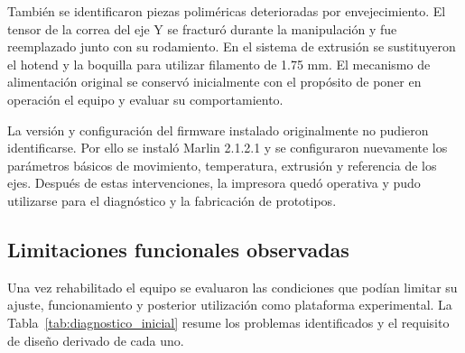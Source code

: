 También se identificaron piezas poliméricas deterioradas por envejecimiento. El tensor de la correa del eje Y se fracturó durante la manipulación y fue reemplazado junto con su rodamiento. En el sistema de extrusión se sustituyeron el hotend y la boquilla para utilizar filamento de 1.75 mm. El mecanismo de alimentación original se conservó inicialmente con el propósito de poner en operación el equipo y evaluar su comportamiento.

La versión y configuración del firmware instalado originalmente no pudieron identificarse. Por ello se instaló Marlin 2.1.2.1 y se configuraron nuevamente los parámetros básicos de movimiento, temperatura, extrusión y referencia de los ejes. Después de estas intervenciones, la impresora quedó operativa y pudo utilizarse para el diagnóstico y la fabricación de prototipos.

\subsection{Limitaciones funcionales observadas}

Una vez rehabilitado el equipo se evaluaron las condiciones que podían limitar su ajuste, funcionamiento y posterior utilización como plataforma experimental. La Tabla~\ref{tab:diagnostico_inicial} resume los problemas identificados y el requisito de diseño derivado de cada uno.


